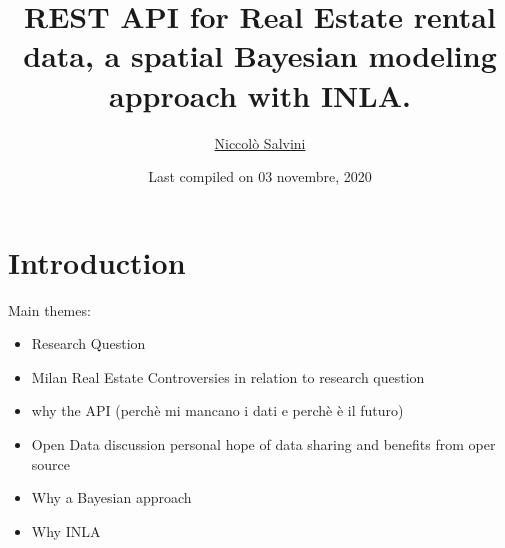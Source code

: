 \documentclass[
  12pt,
  a4paper,
  oneside]{book}
\title{REST API for Real Estate rental data, a spatial Bayesian modeling approach with INLA.}
\author{\href{https://niccolosalvini.netlify.app/}{Niccolò Salvini}}
\date{Last compiled on 03 novembre, 2020}
\providecommand{\tightlist}{%
  \setlength{\itemsep}{0pt}\setlength{\parskip}{0pt}}
\let\oldmaketitle\maketitle
\begin{document}
\maketitle


\newpage

\let\maketitle\oldmaketitle
\maketitle

{
\setcounter{tocdepth}{2}
\tableofcontents
}
\listoftables
\listoffigures
{}
\hypertarget{intro}{%
\chapter{Introduction}\label{intro}}

Main themes:

\begin{itemize}
\tightlist
\item
  Research Question
\item
  Milan Real Estate Controversies in relation to research question
\item
  why the API (perchè mi mancano i dati e perchè è il futuro)
\item
  Open Data discussion personal hope of data sharing and benefits from oper source
\item
  Why a Bayesian approach
\item
  Why INLA
\end{itemize}
\end{document}
